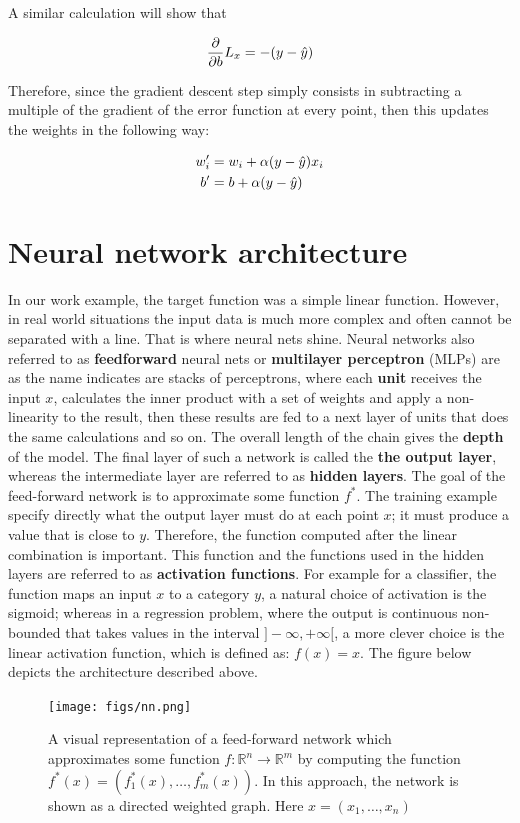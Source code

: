 A similar calculation will show that

$$
\frac{\partial}{\partial b} L_x = -(y - \hat{y})
$$

Therefore, since the gradient descent step simply consists in subtracting a multiple of the gradient of the error function at every point, then this updates the weights in the following way:

\begin{align}
  w^{\prime}_i &= w_i + \alpha (y - \hat{y})x_i \\
  b^{\prime} &= b + \alpha (y - \hat{y})
\end{align}

\section{Neural network architecture}
In our work example, the target function was a simple linear function. However, in real world situations the input data is much more complex and often cannot be separated with a line. That is where neural nets shine. Neural networks also referred to as \textbf{feedforward} neural nets or \textbf{multilayer perceptron} (MLPs) are as the name indicates are stacks of perceptrons, where each \textbf{unit} receives the input $x$, calculates the inner product with a set of weights and apply a non-linearity to the result, then these results are fed to a next layer of units that does the same calculations and so on. The overall length of the chain gives the \textbf{depth} of the model. The final layer of such a network is called the \textbf{the output layer}, whereas the intermediate layer are referred to as \textbf{hidden layers}. The goal of the feed-forward network is to approximate some function $f^*$. The training example specify directly what the output layer must do at each point $x$; it must produce a value that is close to $y$. Therefore, the function computed after the linear combination is important. This function and the functions used in the hidden layers are referred to as \textbf{activation functions}. For example for a classifier, the function maps an input $x$ to a category $y$, a natural choice of activation is the sigmoid; whereas in a regression problem, where the output is continuous non-bounded that takes values in the interval $]-\infty, +\infty[$, a more clever choice is the linear activation function, which is defined as: $f(x) = x$.
The figure below depicts the architecture described above.

\begin{figure}[!htpb]
  \centering
  \texttt{[image: figs/nn.png]}
  \caption[A visual representation of a feed-forward network]{A visual representation of a feed-forward network which approximates some function $f : \mathbb{R}^n \longrightarrow \mathbb{R}^m$ by
    computing the function $f^*(x) = (f^*_1(x), \ldots, f^*_m(x))$. In this approach, the network is shown as a
    directed weighted graph. Here $x = (x_1, \ldots, x_n)$}\label{fig:ann}
\end{figure}

